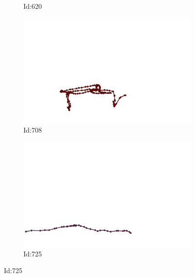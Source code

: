 \documentclass[12pt,twoside]{report}
\begin{document}
\begin{figure}
\begin{subfigure}[b]{0.20\textwidth}
\caption{Id:620}
\end{subfigure}
\begin{subfigure}[b]{0.20\textwidth}
\centering
\includegraphics[width=\textwidth]{../../trajectories/708.png}
\caption{Id:708}
\end{subfigure}
\begin{subfigure}[b]{0.20\textwidth}
\centering
\includegraphics[width=\textwidth]{../../trajectories/725.png}
\caption{Id:725}
\end{subfigure}
\end{figure}
\end{document}
